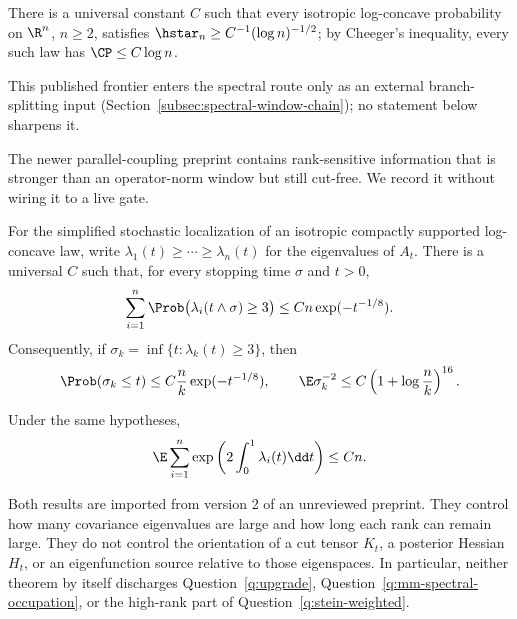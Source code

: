 \documentclass[../../main.tex]{subfiles}
\begin{document}
\begin{theorem}
\label{thm:klartag-logn}
There is a universal constant $C$ such that every isotropic log-concave probability on $\R^n$,
$n\ge2$, satisfies $\hstar_n\ge C^{-1}(\log n)^{-1/2}$; by Cheeger's inequality, every such law
has $\CP\le C\log n$.
\end{theorem}

This published frontier enters the spectral route only as an external branch-splitting input
(Section~\ref{subsec:spectral-window-chain}); no statement below sharpens it.

The newer parallel-coupling preprint contains rank-sensitive information that is stronger than
an operator-norm window but still cut-free.  We record it without wiring it to a live gate.

\begin{theorem}
\label{thm:kl-stopped-rank-tail}
For the simplified stochastic localization of an isotropic compactly supported log-concave law,
write $\lambda_1(t)\ge\cdots\ge\lambda_n(t)$ for the eigenvalues of $A_t$.  There is a universal
$C$ such that, for every stopping time $\sigma$ and $t>0$,
\[
  \sum_{i=1}^n\Prob\bigl(\lambda_i(t\wedge\sigma)\ge3\bigr)
  \le Cn\exp(-t^{-1/8}).
\]
Consequently, if $\sigma_k=\inf\{t:\lambda_k(t)\ge3\}$, then
\[
  \Prob(\sigma_k\le t)\le C\frac nk\exp(-t^{-1/8}),
  \qquad
  \E\sigma_k^{-2}\le C\left(1+\log\frac nk\right)^{16}.
\]
\end{theorem}

\begin{theorem}
\label{thm:kl-integrated-rank-covariance}
Under the same hypotheses,
\[
  \E\sum_{i=1}^n
  \exp\left(2\int_0^1\lambda_i(t)\dd t\right)\le Cn .
\]
\end{theorem}

Both results are imported from version 2 of an unreviewed preprint.  They control how many
covariance eigenvalues are large and how long each rank can remain large.  They do not control
the orientation of a cut tensor $K_t$, a posterior Hessian $H_t$, or an eigenfunction source
relative to those eigenspaces.  In particular, neither theorem by itself discharges
Question~\ref{q:upgrade}, Question~\ref{q:mm-spectral-occupation}, or the high-rank part of
Question~\ref{q:stein-weighted}.
\end{document}
